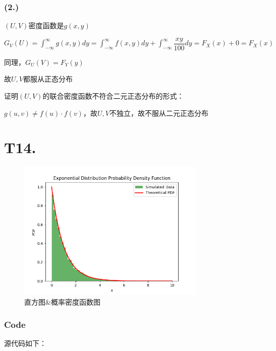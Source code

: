 \documentclass{article}
\newcommand\df[2]{\dfrac{#1}{#2}}
\begin{document}
\subsubsection*{(2.)}

$(U,V)$密度函数是$g(x,y)$

$G_V(U)=\int_{-\infty}^{\infty}g(x,y)dy=\int_{-\infty}^{\infty}f(x,y)dy+\int_{-\infty}^{\infty}\df{xy}{100}dy=F_X(x)+0=F_X(x)$

同理，$G_U(V)=F_Y(y)$

故$U,V$都服从正态分布

证明$(U,V)$的联合密度函数不符合二元正态分布的形式：

$g(u,v)\neq f(u)\cdot f(v)$，故$U,V$不独立，故不服从二元正态分布

\section*{T14. }

\begin{center}
    \begin{figure}[H] %
        \centering %
        \includegraphics[width=0.8\textwidth]{img/Figure_1.png} %
        \caption{直方图\&概率密度函数图} %
        \label{fig1} %
    \end{figure}
\end{center}

\subsubsection*{Code}

源代码如下：


\end{document}
